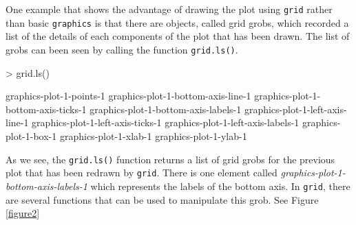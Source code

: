 \documentclass[paper=a4, fontsize=11pt]{report}
\begin{document}
One example that shows the advantage of drawing the plot using \texttt{grid} rather than basic \texttt{graphics} is that there are objects, called grid grobs, which recorded a list of the details of each components of the plot that has been drawn. The list of grobs can been seen by calling the function \texttt{grid.ls()}. \\
\begin{Schunk}
\begin{Sinput}
> grid.ls()
\end{Sinput}
\begin{Soutput}
graphics-plot-1-points-1
graphics-plot-1-bottom-axis-line-1
graphics-plot-1-bottom-axis-ticks-1
graphics-plot-1-bottom-axis-labels-1
graphics-plot-1-left-axis-line-1
graphics-plot-1-left-axis-ticks-1
graphics-plot-1-left-axis-labels-1
graphics-plot-1-box-1
graphics-plot-1-xlab-1
graphics-plot-1-ylab-1
\end{Soutput}
\end{Schunk}


As we see, the \texttt{grid.ls()} function returns a list of grid grobs for the previous plot that has been redrawn by \texttt{grid}. There is one element called \textit{graphics-plot-1-bottom-axis-labels-1} which represents the labels of the bottom axis. In \texttt{grid}, there are several functions that can be used to manipulate this grob. See Figure \ref{figure2} \\
\end{document}
